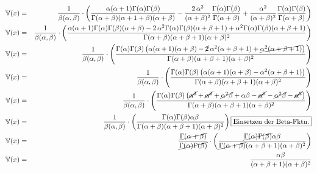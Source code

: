 \begin{uebsp}
\begin{Answer}
\begin{enumerate}[i)]
\begin{multicols}{2}
\begin{eqnarray*}
                \end{eqnarray*}
            \end{multicols}
            \begin{eqnarray*}
                \mathbb{V}(x) &=& \frac{1}{\beta(\alpha, \beta)}\cdot \left(\frac{\alpha(\alpha+1)\Gamma(\alpha)\Gamma(\beta)}{\Gamma(\alpha+\beta)(\alpha+1+\beta)(\alpha+\beta)} - \frac{2\,\alpha^2}{(\alpha+\beta)^2}\frac{\Gamma(\alpha)\Gamma(\beta)}{\Gamma(\alpha+\beta)} + \frac{\alpha^2}{(\alpha+\beta)^2} \frac{\Gamma(\alpha)\Gamma(\beta)}{\Gamma(\alpha+\beta)} \right)\\
                \mathbb{V}(x) &=& \frac{1}{\beta(\alpha, \beta)}\cdot \left(\frac{\alpha(\alpha+1)\Gamma(\alpha)\Gamma(\beta)(\alpha+\beta)- 2\,\alpha^2\Gamma(\alpha)\Gamma(\beta)(\alpha+\beta+1) + \alpha^2\Gamma(\alpha)\Gamma(\beta)(\alpha+\beta+1)}{\Gamma(\alpha+\beta)(\alpha+\beta+1)(\alpha+\beta)^2} \right)\\
                \mathbb{V}(x) &=& \frac{1}{\beta(\alpha, \beta)}\cdot \left(\frac{\Gamma(\alpha)\Gamma(\beta)\left(\alpha(\alpha+1)(\alpha+\beta)- \cancel{2}\,\alpha^2(\alpha+\beta+1) +\cancel{\alpha^2(\alpha+\beta+1)}\right)}{\Gamma(\alpha+\beta)(\alpha+\beta+1)(\alpha+\beta)^2} \right)\\
                \mathbb{V}(x) &=& \frac{1}{\beta(\alpha, \beta)}\cdot \left(\frac{\Gamma(\alpha)\Gamma(\beta)\left(\alpha(\alpha+1)(\alpha+\beta)- \alpha^2(\alpha+\beta+1)\right)}{\Gamma(\alpha+\beta)(\alpha+\beta+1)(\alpha+\beta)^2} \right)\\
                \mathbb{V}(x) &=& \frac{1}{\beta(\alpha, \beta)}\cdot \left(\frac{\Gamma(\alpha)\Gamma(\beta)\left(\cancel{\alpha^3}+\cancel{\alpha^2}+\cancel{\alpha^2\beta}+\alpha\beta - \cancel{\alpha^3}-\cancel{\alpha^2\beta}-\cancel{\alpha^2}\right)}{\Gamma(\alpha+\beta)(\alpha+\beta+1)(\alpha+\beta)^2} \right)\\
                \mathbb{V}(x) &=& \frac{1}{\beta(\alpha, \beta)}\cdot \left(\frac{\Gamma(\alpha)\Gamma(\beta)\alpha\beta}{\Gamma(\alpha+\beta)(\alpha+\beta+1)(\alpha+\beta)^2} \right)\fbox{Einsetzen der Beta-Fktn.}\\
                \mathbb{V}(x) &=& \frac{\cancel{\Gamma(\alpha+\beta)}}{\cancel{\Gamma(\alpha)\Gamma(\beta)}}\cdot \left(\frac{\cancel{\Gamma(\alpha)\Gamma(\beta)}\alpha\beta}{\cancel{\Gamma(\alpha+\beta)}(\alpha+\beta+1)(\alpha+\beta)^2} \right)\\
                \mathbb{V}(x) &=& \frac{\alpha\beta}{(\alpha+\beta+1)(\alpha+\beta)^2}\\
            \end{eqnarray*}
    \end{enumerate}
\end{Answer}
\end{uebsp}
